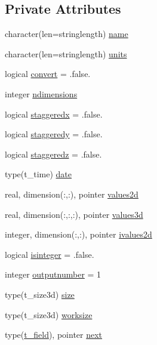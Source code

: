\subsection*{Private Attributes}
\begin{DoxyCompactItemize}
\item 
character(len=stringlength) \mbox{\hyperlink{structmodulecalmetformat_1_1t__field_a56c159ff3951890f0d4d7c3ac30564ce}{name}}
\item 
character(len=stringlength) \mbox{\hyperlink{structmodulecalmetformat_1_1t__field_ac8d58016514d9b68047c1c6de2d6dfc8}{units}}
\item 
logical \mbox{\hyperlink{structmodulecalmetformat_1_1t__field_ae1c0ffc9946344ef15bd595d45159ef1}{convert}} = .false.
\item 
integer \mbox{\hyperlink{structmodulecalmetformat_1_1t__field_a1095f51107591c0b93609b7dca87606e}{ndimensions}}
\item 
logical \mbox{\hyperlink{structmodulecalmetformat_1_1t__field_acbb99febdaef23ec9e9a47502d1fa3b5}{staggeredx}} = .false.
\item 
logical \mbox{\hyperlink{structmodulecalmetformat_1_1t__field_aeca660365b30aa004426496f06a9492a}{staggeredy}} = .false.
\item 
logical \mbox{\hyperlink{structmodulecalmetformat_1_1t__field_a6341e58df27e2864385649e60982906b}{staggeredz}} = .false.
\item 
type(t\+\_\+time) \mbox{\hyperlink{structmodulecalmetformat_1_1t__field_a30d07d9f5e2291b888c3c6dce2e66665}{date}}
\item 
real, dimension(\+:,\+:), pointer \mbox{\hyperlink{structmodulecalmetformat_1_1t__field_a81f2e592880916f6017178f171b0c7ff}{values2d}}
\item 
real, dimension(\+:,\+:,\+:), pointer \mbox{\hyperlink{structmodulecalmetformat_1_1t__field_a6c1fa6efd9f3f29ba20712a5677101bc}{values3d}}
\item 
integer, dimension(\+:,\+:), pointer \mbox{\hyperlink{structmodulecalmetformat_1_1t__field_aee55f1b15c6fa713c2cd7e8863b5df4e}{ivalues2d}}
\item 
logical \mbox{\hyperlink{structmodulecalmetformat_1_1t__field_a19d9d9011f6781ded582299b906c1c41}{isinteger}} = .false.
\item 
integer \mbox{\hyperlink{structmodulecalmetformat_1_1t__field_a2a8ad3bb1dd1f81018effba4067aa7d8}{outputnumber}} = 1
\item 
type(t\+\_\+size3d) \mbox{\hyperlink{structmodulecalmetformat_1_1t__field_afb65fcde82cafbe1e9c8a9684e9f16df}{size}}
\item 
type(t\+\_\+size3d) \mbox{\hyperlink{structmodulecalmetformat_1_1t__field_ac818aee84fdb49936e4fc22bff1c706e}{worksize}}
\item 
type(\mbox{\hyperlink{structmodulecalmetformat_1_1t__field}{t\+\_\+field}}), pointer \mbox{\hyperlink{structmodulecalmetformat_1_1t__field_aacd4d8608777e818fd64be162baabc0c}{next}}
\end{DoxyCompactItemize}


